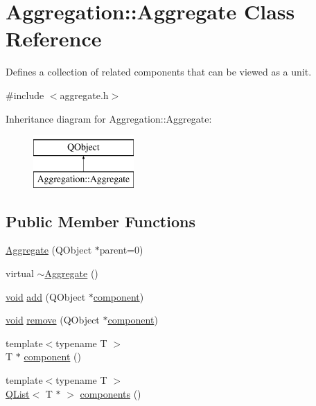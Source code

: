 \hypertarget{class_aggregation_1_1_aggregate}{\section{Aggregation\-:\-:Aggregate Class Reference}
\label{class_aggregation_1_1_aggregate}
}


Defines a collection of related components that can be viewed as a unit.  




{\ttfamily \#include $<$aggregate.\-h$>$}

Inheritance diagram for Aggregation\-:\-:Aggregate\-:\begin{figure}[H]
\begin{center}
\leavevmode
\includegraphics[height=2.000000cm]{class_aggregation_1_1_aggregate}
\end{center}
\end{figure}
\subsection*{Public Member Functions}
\begin{DoxyCompactItemize}
\item 
\hyperlink{class_aggregation_1_1_aggregate_a5579d6da6c4cf165eead1a744e2f6061}{Aggregate} (Q\-Object $\ast$parent=0)
\item 
virtual \hyperlink{class_aggregation_1_1_aggregate_abb1a5795372eb1118c1cc82ac47a2783}{$\sim$\-Aggregate} ()
\item 
\hyperlink{group___u_a_v_objects_plugin_ga444cf2ff3f0ecbe028adce838d373f5c}{void} \hyperlink{class_aggregation_1_1_aggregate_ab6c5e73d1c128d819d57fe4e53596356}{add} (Q\-Object $\ast$\hyperlink{class_aggregation_1_1_aggregate_a6509e7e80142e406ffa24363bb457b59}{component})
\item 
\hyperlink{group___u_a_v_objects_plugin_ga444cf2ff3f0ecbe028adce838d373f5c}{void} \hyperlink{class_aggregation_1_1_aggregate_a83f9cd3aa5d70ce541280d6366c6459b}{remove} (Q\-Object $\ast$\hyperlink{class_aggregation_1_1_aggregate_a6509e7e80142e406ffa24363bb457b59}{component})
\item 
{\footnotesize template$<$typename T $>$ }\\T $\ast$ \hyperlink{class_aggregation_1_1_aggregate_a6509e7e80142e406ffa24363bb457b59}{component} ()
\item 
{\footnotesize template$<$typename T $>$ }\\\hyperlink{class_q_list}{Q\-List}$<$ T $\ast$ $>$ \hyperlink{class_aggregation_1_1_aggregate_ad2189eec2b5f725c0a0db81d5fbf3e25}{components} ()
\end{DoxyCompactItemize}
